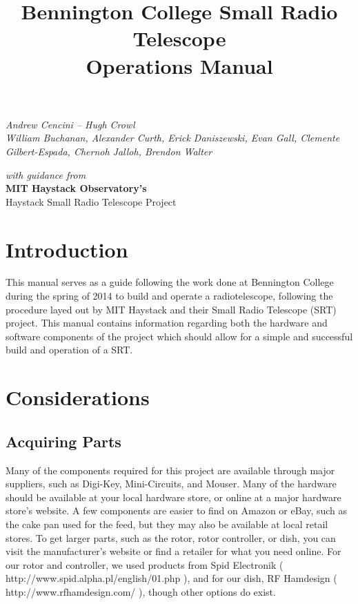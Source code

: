 \documentclass[11pt]{article} %
\title{\huge{Bennington College Small Radio Telescope} \\ Operations Manual}
\author{}
\date{} %
\begin{document}
\maketitle

\lstset{language=sh}

\vspace{4cm}

\begin{center}
\emph{\Large{Andrew Cencini – Hugh Crowl} \\ 
\large{William Buchanan, Alexander Curth, Erick Daniszewski, Evan Gall,
Clemente Gilbert-Espada, Chernoh Jalloh, Brendon Walter}}
\end{center}


\vspace{7cm}

\begin{center}
\emph{with guidance from} \\ 
\Large{\textbf{MIT Haystack Observatory's}} \\ 
Haystack Small Radio Telescope Project
\end{center}
\normalsize

\tableofcontents

\newpage

\section{Introduction}

This manual serves as a guide following the work done at Bennington College during the spring of 2014 to build and operate a radiotelescope, following the procedure layed out by MIT Haystack and their Small Radio Telescope (SRT) project. This manual contains information regarding both the hardware and software components of the project which should allow for a simple and successful build and operation of a SRT.


\section{Considerations}

\subsection{Acquiring Parts}

Many of the components required for this project are available through major suppliers, such as Digi-Key, Mini-Circuits, and Mouser. Many of the hardware should be available at your local hardware store, or online at a major hardware store's website. A few components are easier to find on Amazon or eBay, such as the cake pan used for the feed, but they may also be available at local retail stores. To get larger parts, such as the rotor, rotor controller, or dish, you can visit the manufacturer's website or find a retailer for what you need online. For our rotor and controller, we used products from Spid Electronik ( http://www.spid.alpha.pl/english/01.php ), and for our dish, RF Hamdesign ( http://www.rfhamdesign.com/ ), though other options do exist.
\end{document}
